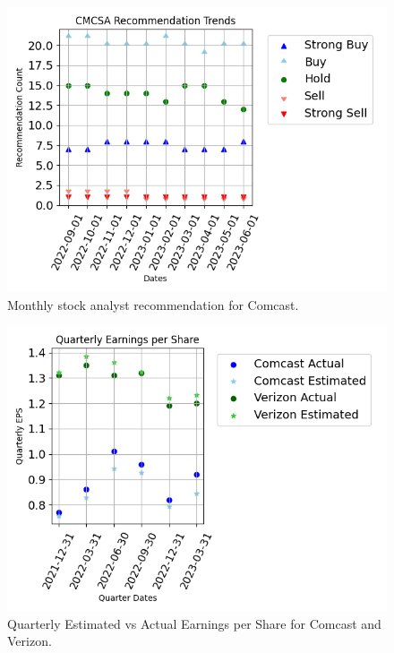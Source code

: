 \documentclass[conference]{IEEEtran}
\begin{document}
\begin{figure}
    \includegraphics[width=\columnwidth]{trends}
    \caption{Monthly stock analyst recommendation for Comcast.}
\end{figure}

\begin{figure}
    \includegraphics[width=\columnwidth]{earnings}
    \caption{Quarterly Estimated vs Actual Earnings per Share for Comcast and Verizon.}
\end{figure}

\clearpage
\end{document}

